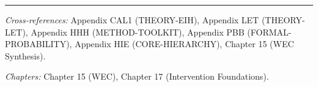 \vspace{1em}
\hrule
\vspace{0.5em}

\noindent\textit{Cross-references:}
Appendix CAL1 (THEORY-EIH),
Appendix LET (THEORY-LET),
Appendix HHH (METHOD-TOOLKIT),
Appendix PBB (FORMAL-PROBABILITY),
Appendix HIE (CORE-HIERARCHY),
Chapter 15 (WEC Synthesis).

\noindent\textit{Chapters:} Chapter 15 (WEC), Chapter 17 (Intervention Foundations).


